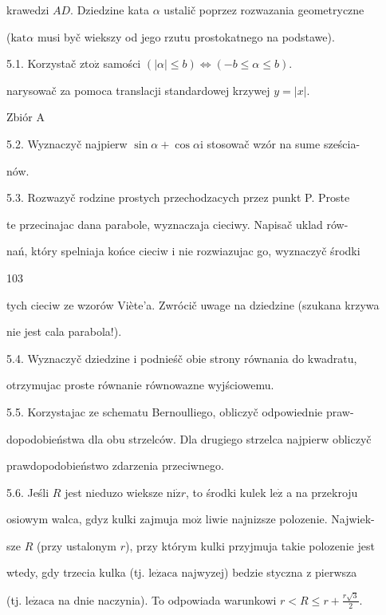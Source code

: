 \documentclass[a4paper,12pt]{article}
\begin{document}
krawedzi $AD$. Dziedzine kata $\alpha$ ustalič poprzez rozwazania geometryczne

($\mathrm{k}\mathrm{a}\mathrm{t}\alpha$ musi byč wiekszy od jego rzutu prostokatnego na podstawe).

5.1. Korzystač $\mathrm{z} \mathrm{t}\mathrm{o}\dot{\mathrm{z}}$ samości $(|\alpha|\leq b) \Leftrightarrow (-b\leq\alpha\leq b)$.

narysowač za pomoca translacji standardowej krzywej $y=|x|.$

Zbiór A

5.2. Wyznaczyč najpierw $\sin\alpha+\cos\alpha \mathrm{i}$ stosowač wzór na sume sześcia-

nów.

5.3. Rozwazyč rodzine prostych przechodzacych przez punkt P. Proste

te przecinajac dana parabole, wyznaczaja cieciwy. Napisač uklad rów-

nań, który spelniaja końce cieciw i nie rozwiazujac go, wyznaczyč środki





103

tych cieciw ze wzorów Viète'a. Zwrócič uwage na dziedzine (szukana krzywa

nie jest cala parabola!).

5.4. Wyznaczyč dziedzine $\mathrm{i}$ podnieśč obie strony równania do kwadratu,

otrzymujac proste równanie równowazne wyjściowemu.

5.5. Korzystajac ze schematu Bernoulliego, obliczyč odpowiednie praw-

dopodobieństwa dla obu strzelców. Dla drugiego strzelca najpierw obliczyč

prawdopodobieństwo zdarzenia przeciwnego.

5.6. Jeśli $R$ jest nieduzo wieksze $\mathrm{n}\mathrm{i}\dot{\mathrm{z}}r$, to środki kulek $\mathrm{l}\mathrm{e}\dot{\mathrm{z}}$ a na przekroju

osiowym walca, gdyz kulki zajmuja $\mathrm{m}\mathrm{o}\dot{\mathrm{z}}$ liwie najnizsze polozenie. Najwiek-

sze $R$ (przy ustalonym $r$), przy którym kulki przyjmuja takie polozenie jest

wtedy, gdy trzecia kulka (tj. $\mathrm{l}\mathrm{e}\dot{\mathrm{z}}\mathrm{a}\mathrm{c}\mathrm{a}$ najwyzej) bedzie styczna $\mathrm{z}$ pierwsza

(tj. $\mathrm{l}\mathrm{e}\dot{\mathrm{z}}\mathrm{a}\mathrm{c}\mathrm{a}$ na dnie naczynia). To odpowiada warunkowi $r<R\displaystyle \leq r+\frac{r\sqrt{3}}{2}.$
\end{document}
